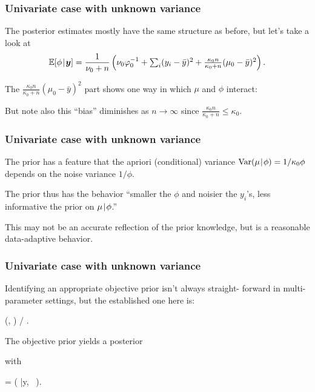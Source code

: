\documentclass[18pt]{beamer}
\newcommand{\defineTightItemizeSpacing}{%
	\setlength{\abovedisplayskip}{.25\baselineskip}%
	\setlength{\belowdisplayskip}{.25\baselineskip}%
}
\newenvironment{tightEquation*}{%
	\defineTightItemizeSpacing%
	\begin{equation*}
}{
	\end{equation*} \ignorespacesafterend
}
\newcommand{\given}{\thinnerspace | \thinnerspace}
\newcommand{\thinnerspace}{\mskip.5\thinmuskip}
\newcommand{\expectation}{\mathbb{E}}
\newcommand{\variance}{\mathrm{Var}}
\newcommand{\normalDist}{\mathcal{N}}
\newcommand{\gammaDist}{\mathrm{Gamma}}
\newcommand{\density}{\pi}
\begin{document}
\begin{frame}
\frametitle{Univariate case with unknown variance}
The posterior estimates mostly have the same structure as before, but let's take a look at
\begin{equation*}
\expectation[ \phi \given \bm{y} ]
	= \frac{1}{\nu_0 + n} \left(
		\nu_0 \varphi_0^{-1} 
		+ \textstyle \sum_i (y_i - \bar{y})^2
		+ \frac{\kappa_0 n}{\kappa_0 + n} (\mu_0 - \bar{y} )^2
	\right).
\end{equation*}

\pause
The $\frac{\kappa_0 n}{\kappa_0 + n} (\mu_0 - \bar{y} )^2$ part shows one way in which $\mu$ and $\phi$ interact:
\begin{tightEquation*}
%
\end{tightEquation*}

\pause
\smallskip
But note also this ``bias'' diminishes as $n \to \infty$ since $\frac{\kappa_0 n}{\kappa_0 + n} \leq \kappa_0$.
\end{frame}


\begin{frame}
\frametitle{Univariate case with unknown variance}
The prior has a feature that the apriori (conditional) variance $\variance(\mu \given \phi) = 1 / \kappa_0 \phi$ depends on the noise variance $1 / \phi$.

\pause
\smallskip
The prior thus has the behavior ``smaller the $\phi$ and noisier the $y_i$'s, less informative the prior on $\mu \given \phi$.''

\pause
\smallskip
This may not be an accurate reflection of the prior knowledge, but is a reasonable data-adaptive behavior.
\end{frame}


\begin{frame}
\frametitle{Univariate case with unknown variance}
Identifying an appropriate objective prior isn't always straight- forward in multi-parameter settings, but the established one here is:
\begin{tightEquation*}
\density(\mu, \phi)  / \phi.
\end{tightEquation*}

\pause
The objective prior yields a posterior
with
\begin{tightEquation*}
\expectation\!\left[ 
	(\mu, \phi) \given \bm{y}
\right]
	= \left( 
		\bar{y}, \, 
	\right).
\end{tightEquation*}
\end{frame}
\end{document}
